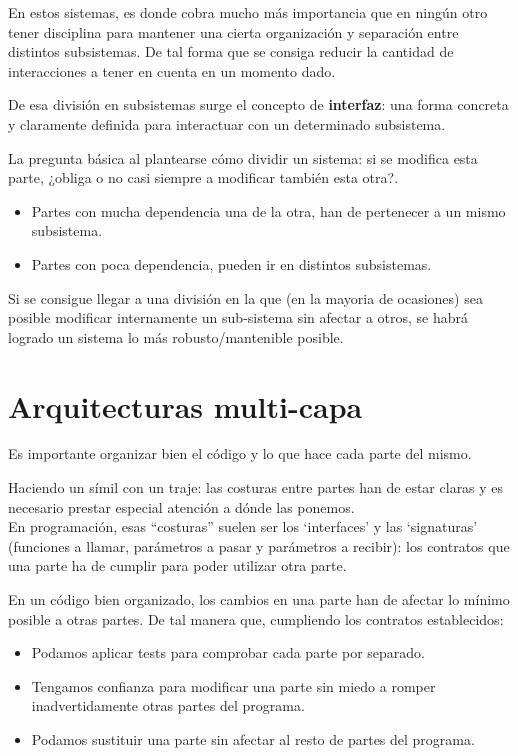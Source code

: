 \documentclass[spanish,12pt,a4paper,final,oneside]{book}
\begin{document}
En estos sistemas, es donde cobra mucho más importancia que en ningún otro tener disciplina para mantener una cierta organización y separación entre distintos subsistemas. De tal forma que se consiga reducir la cantidad de interacciones a tener en cuenta en un momento dado.

De esa división en subsistemas surge el concepto de \textbf{interfaz}: una forma concreta y claramente definida para interactuar con un determinado subsistema.

La pregunta básica al plantearse cómo dividir un sistema: si se modifica esta parte, ¿obliga o no casi siempre a modificar también esta otra?.
\begin{itemize}
\item Partes con mucha dependencia una de la otra, han de pertenecer a un mismo subsistema. 
\item Partes con poca dependencia, pueden ir en distintos subsistemas.
\end{itemize}

Si se consigue llegar a una división en la que (en la mayoria de ocasiones) sea posible modificar internamente un sub-sistema sin afectar a otros, se habrá logrado un sistema lo más robusto/mantenible posible.

\section{Arquitecturas multi-capa}

Es importante organizar bien el código y lo que hace cada parte del mismo.

Haciendo un símil con un traje: las costuras entre partes han de estar claras y es necesario prestar especial atención a dónde las ponemos.
\\En programación, esas ``costuras'' suelen ser los `interfaces' y las `signaturas' (funciones a llamar, parámetros a pasar y parámetros a recibir): los contratos  que una parte ha de cumplir para poder utilizar otra parte.

En un código bien organizado, los cambios en una parte han de afectar lo mínimo posible a otras partes. De tal manera que, cumpliendo los contratos establecidos:
\begin{itemize}
\item Podamos aplicar tests para comprobar cada parte por separado.
\item Tengamos confianza para modificar una parte sin miedo a romper inadvertidamente otras partes del programa.
\item Podamos sustituir una parte sin afectar al resto de partes del programa.
\end{itemize}
\end{document}

